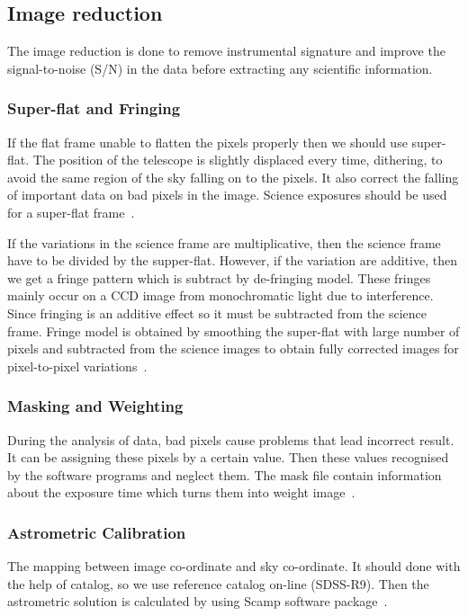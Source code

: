 \subsection{Image reduction}\label{subsec:imageReduction}
The image reduction is done to remove instrumental signature and improve the signal-to-noise (S/N) in the data before extracting any scientific information\cite{manual}.
\subsubsection{Super-flat and Fringing}
If the flat frame unable to flatten the pixels properly then we should use super-flat. The position of the telescope is slightly displaced every time, dithering, to avoid the same region of the sky falling on to the pixels. It also correct the falling of important data on bad pixels in the image. Science exposures should be used for a super-flat frame~\cite{manual}.

If the variations in the science frame are multiplicative, then the science frame  have to be divided by the supper-flat. However, if the variation are additive, then  we get a fringe pattern which is subtract by de-fringing model. These fringes mainly occur on a CCD image from monochromatic light due to interference. Since fringing is an additive effect so it must be subtracted from the science frame. Fringe model is obtained by smoothing the super-flat with large number of pixels and subtracted from the science images to obtain fully corrected images for pixel-to-pixel variations~\cite{manual}.

\subsubsection{Masking and Weighting }
During the analysis of data, bad pixels cause problems that lead incorrect result. It can be assigning these pixels by a certain value. Then these values recognised by the software programs and neglect them. 
The mask file contain information about the exposure time which turns them into weight image~\cite{manual}. 
\subsubsection{Astrometric Calibration}
The mapping between image co-ordinate and sky co-ordinate. It should done with the help of catalog, so we use reference catalog on-line (SDSS-R9). Then the astrometric solution is calculated by using Scamp software package~\cite{manual}.
